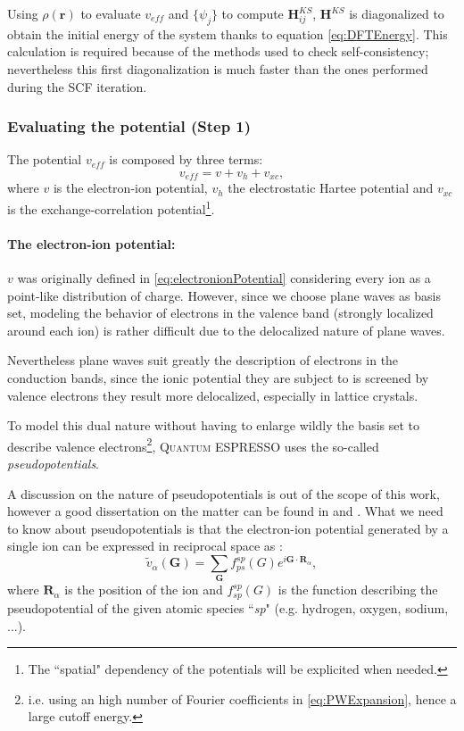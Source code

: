 \documentclass[a4paper,12pt]{article}
\newcommand\mf[1]{\mathbf{#1}}
\newcommand\dens{\rho(\mathbf{r})}
\newcommand\QE{\textsc{Quantum} ESPRESSO }
\begin{document}
Using $\dens$ to evaluate $v_{eff}$ and $\{\psi_j\}$ to compute $\mf{H}_{ij}^{KS}$, $\mf{H}^{KS}$ is diagonalized to obtain the initial energy of the system thanks to equation \eqref{eq:DFTEnergy}. 
This calculation is required because of the methods used to check self-consistency; nevertheless this first diagonalization is much faster than the ones performed during the SCF iteration.




\subsubsection{Evaluating the potential (Step 1)}\label{sec:Potential}

The potential $v_{eff}$ is composed by three terms:
\begin{equation}
	v_{eff} = v + v_{h} + v_{xc},
\end{equation}
where $v$ is the electron-ion potential, $v_{h}$ the electrostatic Hartee potential and $v_{xc}$ is the exchange-correlation potential\footnote{The ``spatial" dependency of the potentials will be explicited when needed.}.

\paragraph{The electron-ion potential:}
$v$ was originally defined in \eqref{eq:electronionPotential} considering every ion as a point-like distribution of charge. 
However, since we choose plane waves as basis set, modeling the behavior of electrons in the valence band (strongly localized around each ion) is rather difficult due to the delocalized nature of plane waves.

Nevertheless plane waves suit greatly the description of electrons in the conduction bands, since the ionic potential they are subject to is screened by valence electrons\cite[p.136]{Manini} they result more delocalized, especially in lattice crystals.

To model this dual nature without having to enlarge wildly the basis set to describe valence electrons\footnote{i.e. using an high number of Fourier coefficients in \eqref{eq:PWExpansion}, hence a large cutoff energy.}, \QE uses the so-called \textit{pseudopotentials}.

A discussion on the nature of pseudopotentials is out of the scope of this work, however a good dissertation on the matter can be found in \cite[chap. 11]{Martin} and \cite[p.90]{Marx}.
What we need to know about pseudopotentials is that the electron-ion potential generated by a single ion can be expressed in reciprocal space as :
\begin{equation}
	\tilde{v}_{\alpha}(\mf{G}) = \sum_{\mf{G}} f_{ps}^{sp}(G) e^{i \mf{G} \cdot \mf{R}_{\alpha}},
\end{equation}
where  $\mf{R}_{\alpha}$ is the position of the ion and $f_{sp}^{sp}(G)$ is the function describing the pseudopotential of the given atomic species ``\textit{sp}" (e.g. hydrogen, oxygen, sodium, ...).
\end{document}
